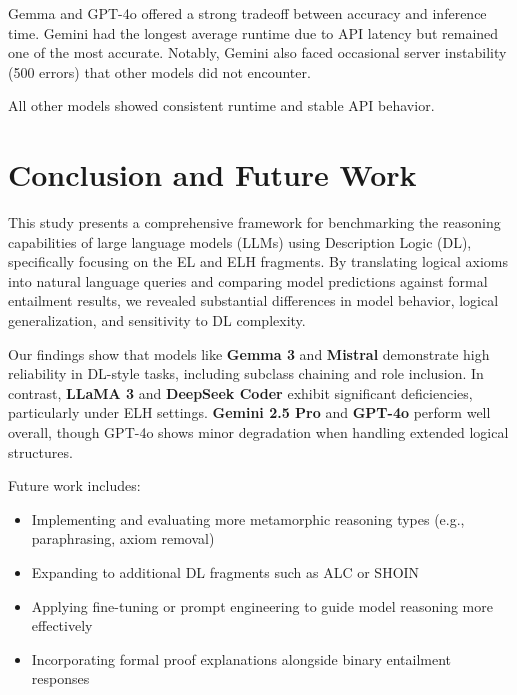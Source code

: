 \documentclass[11pt]{article}
\begin{document}
Gemma and GPT-4o offered a strong tradeoff between accuracy and inference time. Gemini had the longest average runtime due to API latency but remained one of the most accurate. Notably, Gemini also faced occasional server instability (500 errors) that other models did not encounter.

All other models showed consistent runtime and stable API behavior.

\section{Conclusion and Future Work}
This study presents a comprehensive framework for benchmarking the reasoning capabilities of large language models (LLMs) using Description Logic (DL), specifically focusing on the EL and ELH fragments. By translating logical axioms into natural language queries and comparing model predictions against formal entailment results, we revealed substantial differences in model behavior, logical generalization, and sensitivity to DL complexity.

Our findings show that models like \textbf{Gemma 3} and \textbf{Mistral} demonstrate high reliability in DL-style tasks, including subclass chaining and role inclusion. In contrast, \textbf{LLaMA 3} and \textbf{DeepSeek Coder} exhibit significant deficiencies, particularly under ELH settings. \textbf{Gemini 2.5 Pro} and \textbf{GPT-4o} perform well overall, though GPT-4o shows minor degradation when handling extended logical structures.

Future work includes:
\begin{itemize}
    \item Implementing and evaluating more metamorphic reasoning types (e.g., paraphrasing, axiom removal)
    \item Expanding to additional DL fragments such as ALC or SHOIN
    \item Applying fine-tuning or prompt engineering to guide model reasoning more effectively
    \item Incorporating formal proof explanations alongside binary entailment responses
\end{itemize}

\newpage



\nocite{*}
\end{document}
